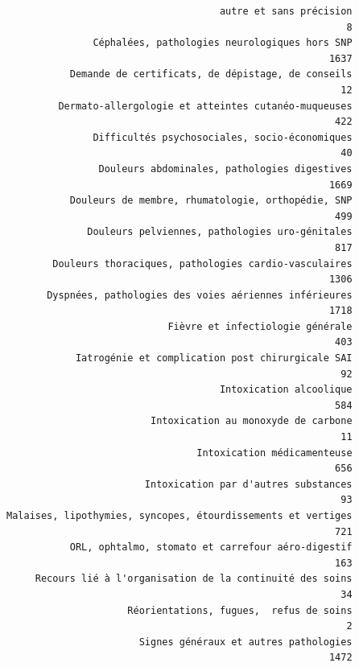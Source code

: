\documentclass[]{article}
\begin{document}
\begin{verbatim}
                                     autre et sans précision 
                                                           8 
               Céphalées, pathologies neurologiques hors SNP 
                                                        1637 
           Demande de certificats, de dépistage, de conseils 
                                                          12 
         Dermato-allergologie et atteintes cutanéo-muqueuses 
                                                         422 
               Difficultés psychosociales, socio-économiques 
                                                          40 
                Douleurs abdominales, pathologies digestives 
                                                        1669 
           Douleurs de membre, rhumatologie, orthopédie, SNP 
                                                         499 
              Douleurs pelviennes, pathologies uro-génitales 
                                                         817 
        Douleurs thoraciques, pathologies cardio-vasculaires 
                                                        1306 
       Dyspnées, pathologies des voies aériennes inférieures 
                                                        1718 
                            Fièvre et infectiologie générale 
                                                         403 
            Iatrogénie et complication post chirurgicale SAI 
                                                          92 
                                     Intoxication alcoolique 
                                                         584 
                         Intoxication au monoxyde de carbone 
                                                          11 
                                 Intoxication médicamenteuse 
                                                         656 
                        Intoxication par d'autres substances 
                                                          93 
Malaises, lipothymies, syncopes, étourdissements et vertiges 
                                                         721 
           ORL, ophtalmo, stomato et carrefour aéro-digestif 
                                                         163 
     Recours lié à l'organisation de la continuité des soins 
                                                          34 
                     Réorientations, fugues,  refus de soins 
                                                           2 
                       Signes généraux et autres pathologies 
                                                        1472 

\end{verbatim}
\end{document}
